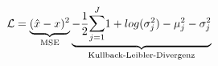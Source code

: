 \documentclass[border=5]{standalone}
\begin{document}
\begin{math}
	\mathcal{L} = \underbrace{(\hat{x} - x)^2}_{\text{MSE}} \underbrace{- \frac{1}{2}\mathlarger{\sum}_{j=1}^{J} 1+ log(\sigma_j^2)-\mu_j^2-\sigma_j^2}_{\text{Kullback-Leibler-Divergenz}}
\end{math}
\end{document}
